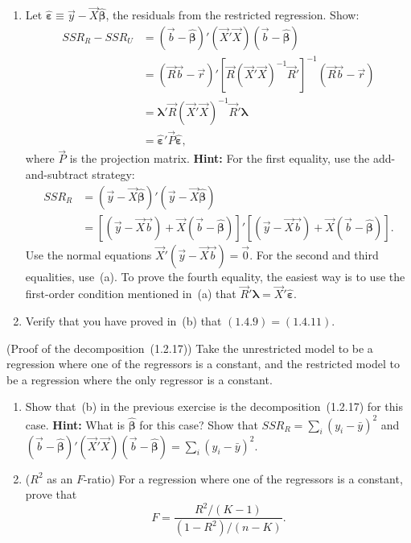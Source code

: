 \begin{problemset}
\begin{enumerate}[label=(\alph*)]
\item Let $\hat{\bm{\varepsilon}} \equiv \vec{y} - \vec{X}\widehat{\bm{\beta}}$,
the residuals from the restricted regression. Show:
%
\begin{align*}
SSR_R - SSR_U
&= (\vec{b} - \widehat{\bm{\beta}})' (\vec{X}'\vec{X})
   (\vec{b} - \widehat{\bm{\beta}}) \\
&= (\vec{R}\vec{b} - \vec{r})'
   [\vec{R}(\vec{X}'\vec{X})^{-1}\vec{R}']^{-1}
   (\vec{R}\vec{b} - \vec{r}) \\
&= \bm{\lambda}'\vec{R}(\vec{X}'\vec{X})^{-1}\vec{R}'\bm{\lambda} \\
&= \hat{\bm{\varepsilon}}'\vec{P}\hat{\bm{\varepsilon}},
\end{align*}
%
where $\vec{P}$ is the projection matrix. \textbf{Hint:} For the first
equality, use the add-and-subtract strategy:
%
\begin{align*}
SSR_R &= (\vec{y} - \vec{X}\widehat{\bm{\beta}})'
         (\vec{y} - \vec{X}\widehat{\bm{\beta}}) \\
      &= [(\vec{y} - \vec{X}\vec{b})
         + \vec{X}(\vec{b} - \widehat{\bm{\beta}})]'
         [(\vec{y} - \vec{X}\vec{b})
         + \vec{X}(\vec{b} - \widehat{\bm{\beta}})].
\end{align*}
%
Use the normal equations $\vec{X}'(\vec{y} - \vec{X}\vec{b}) = \vec{0}$.
For the second and third equalities, use~(a). To prove the fourth equality,
the easiest way is to use the first-order condition mentioned in~(a) that
$\vec{R}'\bm{\lambda} = \vec{X}'\hat{\bm{\varepsilon}}$.

\item Verify that you have proved in~(b) that $(1.4.9) = (1.4.11)$.
\end{enumerate}

\exercise[6] (Proof of the decomposition~(1.2.17))\quad
Take the unrestricted model to be a regression where one of the regressors
is a constant, and the restricted model to be a regression where the only
regressor is a constant.

\begin{enumerate}[label=(\alph*)]
\item Show that~(b) in the previous exercise is the
decomposition~(1.2.17) for this case. \textbf{Hint:} What is
$\widehat{\bm{\beta}}$ for this case? Show that
$SSR_R = \sum_i (y_i - \bar{y})^2$ and
$(\vec{b} - \widehat{\bm{\beta}})' (\vec{X}'\vec{X})
(\vec{b} - \widehat{\bm{\beta}}) = \sum_i (\hat{y}_i - \bar{y})^2$.

\item ($R^2$ as an $F$-ratio)\quad
For a regression where one of the regressors is a constant, prove that
%
\[
F = \frac{R^2/(K-1)}{(1 - R^2)/(n - K)}.
\]
\end{enumerate}


\end{problemset}
